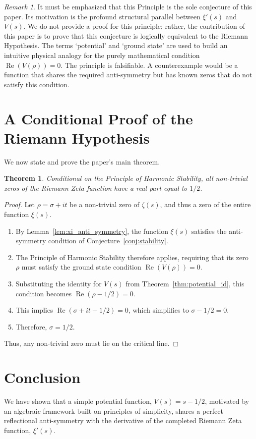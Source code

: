 \documentclass{amsart}
\theoremstyle{plain}
\newtheorem{theorem}{Theorem}[section]
\theoremstyle{definition}
\theoremstyle{remark}
\newtheorem*{remark}{Remark}
\DeclareMathOperator{\re}{Re}
\begin{document}
\begin{remark}
It must be emphasized that this Principle is the sole conjecture of this paper. Its motivation is the profound structural parallel between $\xi'(s)$ and $V(s)$. We do not provide a proof for this principle; rather, the contribution of this paper is to prove that this conjecture is logically equivalent to the Riemann Hypothesis. The terms `potential' and `ground state' are used to build an intuitive physical analogy for the purely mathematical condition $\re(V(\rho))=0$. The principle is falsifiable. A counterexample would be a function that shares the required anti-symmetry but has known zeros that do not satisfy this condition.
\end{remark}

\section{A Conditional Proof of the Riemann Hypothesis}
We now state and prove the paper's main theorem.
\begin{theorem}
Conditional on the Principle of Harmonic Stability, all non-trivial zeros of the Riemann Zeta function have a real part equal to $1/2$.
\end{theorem}
\begin{proof}
Let $\rho = \sigma + it$ be a non-trivial zero of $\zeta(s)$, and thus a zero of the entire function $\xi(s)$.
\begin{enumerate}
    \item By Lemma~\ref{lem:xi_anti_symmetry}, the function $\xi(s)$ satisfies the anti-symmetry condition of Conjecture~\ref{conj:stability}.
    \item The Principle of Harmonic Stability therefore applies, requiring that its zero $\rho$ must satisfy the ground state condition $\re(V(\rho))=0$.
    \item Substituting the identity for $V(s)$ from Theorem~\ref{thm:potential_id}, this condition becomes $\re(\rho - 1/2) = 0$.
    \item This implies $\re(\sigma + it - 1/2) = 0$, which simplifies to $\sigma - 1/2 = 0$.
    \item Therefore, $\sigma = 1/2$.
\end{enumerate}
Thus, any non-trivial zero must lie on the critical line.
\end{proof}

\section{Conclusion}
We have shown that a simple potential function, $V(s) = s - 1/2$, motivated by an algebraic framework built on principles of simplicity, shares a perfect reflectional anti-symmetry with the derivative of the completed Riemann Zeta function, $\xi'(s)$.
\end{document}

